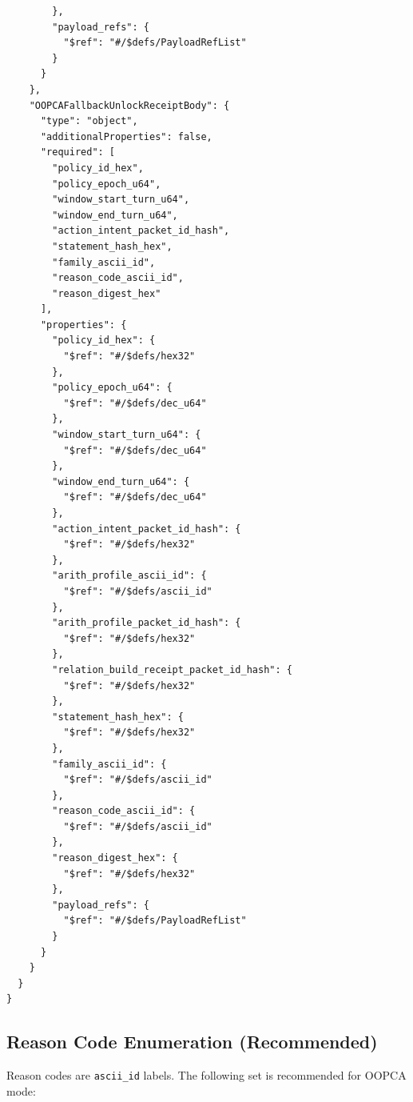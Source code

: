 \documentclass[11pt]{article}
\begin{document}
\begin{lstlisting}
        },
        "payload_refs": {
          "$ref": "#/$defs/PayloadRefList"
        }
      }
    },
    "OOPCAFallbackUnlockReceiptBody": {
      "type": "object",
      "additionalProperties": false,
      "required": [
        "policy_id_hex",
        "policy_epoch_u64",
        "window_start_turn_u64",
        "window_end_turn_u64",
        "action_intent_packet_id_hash",
        "statement_hash_hex",
        "family_ascii_id",
        "reason_code_ascii_id",
        "reason_digest_hex"
      ],
      "properties": {
        "policy_id_hex": {
          "$ref": "#/$defs/hex32"
        },
        "policy_epoch_u64": {
          "$ref": "#/$defs/dec_u64"
        },
        "window_start_turn_u64": {
          "$ref": "#/$defs/dec_u64"
        },
        "window_end_turn_u64": {
          "$ref": "#/$defs/dec_u64"
        },
        "action_intent_packet_id_hash": {
          "$ref": "#/$defs/hex32"
        },
        "arith_profile_ascii_id": {
          "$ref": "#/$defs/ascii_id"
        },
        "arith_profile_packet_id_hash": {
          "$ref": "#/$defs/hex32"
        },
        "relation_build_receipt_packet_id_hash": {
          "$ref": "#/$defs/hex32"
        },
        "statement_hash_hex": {
          "$ref": "#/$defs/hex32"
        },
        "family_ascii_id": {
          "$ref": "#/$defs/ascii_id"
        },
        "reason_code_ascii_id": {
          "$ref": "#/$defs/ascii_id"
        },
        "reason_digest_hex": {
          "$ref": "#/$defs/hex32"
        },
        "payload_refs": {
          "$ref": "#/$defs/PayloadRefList"
        }
      }
    }
  }
}
\end{lstlisting}

\subsection{Reason Code Enumeration (Recommended)}

Reason codes are \texttt{ascii\_id} labels. The following set is recommended for OOPCA mode:
\end{document}
